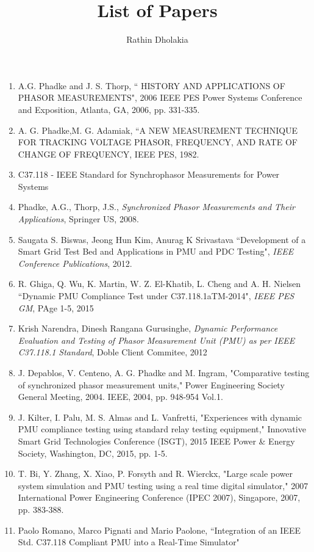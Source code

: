 \documentclass[11pt,a4paper]{article}
\author{Rathin Dholakia}
\title{List of Papers}
\begin{document}
\begin{enumerate}
\item A.G. Phadke and J. S. Thorp, `` HISTORY AND APPLICATIONS OF PHASOR MEASUREMENTS", 2006 IEEE PES Power Systems Conference and Exposition, Atlanta, GA, 2006, pp. 331-335.
\item A. G. Phadke,M. G. Adamiak, ``A NEW MEASUREMENT TECHNIQUE FOR TRACKING VOLTAGE PHASOR, FREQUENCY, AND RATE OF CHANGE OF FREQUENCY, IEEE PES, 1982.
\item  C37.118 - IEEE Standard for Synchrophasor Measurements for Power Systems
\item Phadke, A.G., Thorp, J.S.,  \textit{Synchronized Phasor Measurements and Their Applications}, Springer US, 2008.
\item Saugata S. Biswas, Jeong Hun Kim, Anurag K Srivastava ``Development of a Smart Grid Test Bed and Applications in PMU and PDC Testing", \textit{IEEE Conference Publications}, 2012.
\item R. Ghiga, Q. Wu, K. Martin, W. Z. El-Khatib, L. Cheng and A. H. Nielsen ``Dynamic PMU Compliance Test under C37.118.1aTM-2014", \textit{IEEE PES GM}, PAge 1-5, 2015
\item Krish Narendra, Dinesh Rangana Gurusinghe, \textit{Dynamic Performance Evaluation and Testing of Phasor Measurement Unit (PMU) as per IEEE C37.118.1 Standard}, Doble Client Commitee, 2012 
\item J. Depablos, V. Centeno, A. G. Phadke and M. Ingram, "Comparative testing of synchronized phasor measurement units," Power Engineering Society General Meeting, 2004. IEEE, 2004, pp. 948-954 Vol.1.
\item J. Kilter, I. Palu, M. S. Almas and L. Vanfretti, "Experiences with dynamic PMU compliance testing using standard relay testing equipment," Innovative Smart Grid Technologies Conference (ISGT), 2015 IEEE Power \& Energy Society, Washington, DC, 2015, pp. 1-5.
\item T. Bi, Y. Zhang, X. Xiao, P. Forsyth and R. Wierckx, "Large scale power system simulation and PMU testing using a real time digital simulator," 2007 International Power Engineering Conference (IPEC 2007), Singapore, 2007, pp. 383-388.
\item Paolo Romano, Marco Pignati and Mario Paolone, ``Integration of an IEEE Std. C37.118 Compliant PMU into a Real-Time Simulator"
\end{enumerate}
\end{document}
